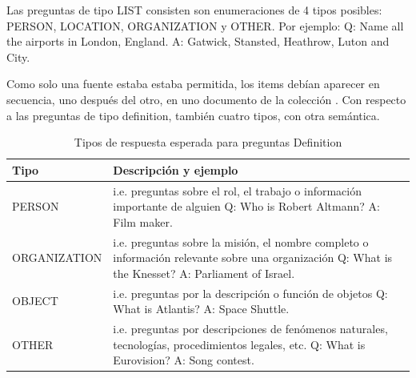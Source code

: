 Las preguntas de tipo LIST consisten son enumeraciones de 4 tipos posibles: PERSON, LOCATION, ORGANIZATION y OTHER.
Por ejemplo:\newline
Q: Name all the airports in London, England. \newline
A: Gatwick, Stansted, Heathrow, Luton and City.

Como solo una fuente estaba estaba permitida, los items debían aparecer en secuencia, uno después del otro, en uno documento de la colección .
Con respecto a las preguntas de tipo definition, también cuatro tipos, con otra semántica.


\begin{center}
\begin{table}[H]
\centering
\begin{tabular}{| l | p{12cm}|}
\hline
Tipo & Descripción y ejemplo \\ \hline
PERSON & i.e. preguntas sobre el rol, el trabajo o información importante de alguien \newline
 Q: Who is Robert Altmann? \newline
 A: Film maker. \\ \hline
ORGANIZATION & i.e. preguntas sobre la misión, el nombre completo o información relevante sobre una organización \newline
 Q: What is the Knesset? \newline
 A: Parliament of Israel. \\ \hline
OBJECT & i.e. preguntas por la descripción o función de objetos \newline
Q: What is Atlantis? \newline
A: Space Shuttle. \\ \hline
OTHER & i.e. preguntas por descripciones de fenómenos naturales, tecnologías, procedimientos legales, etc. \newline
Q: What is Eurovision? \newline
A: Song contest. \\ \hline
\end{tabular}
\caption{Tipos de respuesta esperada para preguntas Definition}
\label{table:definition-questions}
\end{table}
\end{center}

